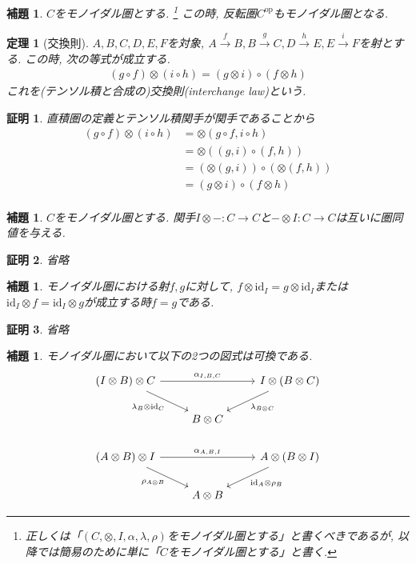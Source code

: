 \documentclass[a4paper,12pt]{ltjsarticle}
\theoremstyle{break}
\newtheorem{lem}[thm]{補題}
\newtheorem{thrm}[thm]{定理}
\newtheorem*{prf}{証明}
\newcommand{\Op}{\mathrm{op}}
\newcommand{\xr}[1]{\xrightarrow{#1}}
\newcommand{\id}{\mathrm{id}}
\newcommand{\ci}{\circ}
\newcommand{\al}{\alpha}
\newcommand{\la}{\lambda}
\newcommand{\ot}{\otimes}
\numberwithin{equation}{section}
\begin{document}
\begin{lem}
  $C$をモノイダル圏とする.
  \footnote{
    正しくは「$(C,\ot,I,\al,\la,\rho)$をモノイダル圏とする」と書くべきであるが, 以降では簡易のために単に「$C$をモノイダル圏とする」と書く. 
  } 
  この時, 反転圏$C^{\Op}$もモノイダル圏となる. 
\end{lem}

\begin{thrm}[交換則]
  $A,B,C,D,E,F$を対象, $A \xr{f} B, B \xr{g} C, D \xr{h} E, E \xr{i} F$を射とする. 
  この時, 次の等式が成立する. 
  \begin{align*}
    (g \ci f) \ot (i \ci h) = (g \ot i) \ci (f \ot h)
  \end{align*}
  これを(テンソル積と合成の)交換則(interchange law)という. 
\end{thrm}

\begin{prf}
  直積圏の定義とテンソル積関手が関手であることから
  \begin{align*}
    (g \ci f) \ot (i \ci h)
    &= \ot(g \ci f, i \ci h) \\
    &= \ot((g,i) \ci (f,h)) \\
    &= (\ot(g,i)) \ci (\ot(f,h)) \\
    &= (g \ot i) \ci (f \ot h) \\
  \end{align*}
\end{prf}

\begin{lem}
  $C$をモノイダル圏とする. 
  関手$I \ot -: C \to C$と$- \ot I: C \to C$は互いに圏同値を与える. 
\end{lem}

\begin{prf}
  省略
\end{prf}

\begin{lem}
  モノイダル圏における射$f,g$に対して, $f \ot \id_I=g \ot \id_I$または$\id_I \ot f=\id_I \ot g$が成立する時$f=g$である. 
\end{lem}

\begin{prf}
  省略
\end{prf}

\begin{lem}
  モノイダル圏において以下の2つの図式は可換である. 
  \[\begin{tikzcd}
    {(I \ot B) \ot C} && {I \ot (B \ot C)} \\
    & {B \ot C} \\
    {(A \ot B) \ot I} && {A \ot (B \ot I)} \\
    & {A \ot B}
    \arrow["{\al_{I,B,C}}", from=1-1, to=1-3]
    \arrow["{\la_B \ot \id_C}"', from=1-1, to=2-2]
    \arrow["{\al_{A,B,I}}", from=3-1, to=3-3]
    \arrow["{\id_A \ot \rho_B}", from=3-3, to=4-2]
    \arrow["{\rho_{A \ot B}}"', from=3-1, to=4-2]
    \arrow["{\la_{B \ot C}}", from=1-3, to=2-2]
  \end{tikzcd}\]
\end{lem}
\end{document}
